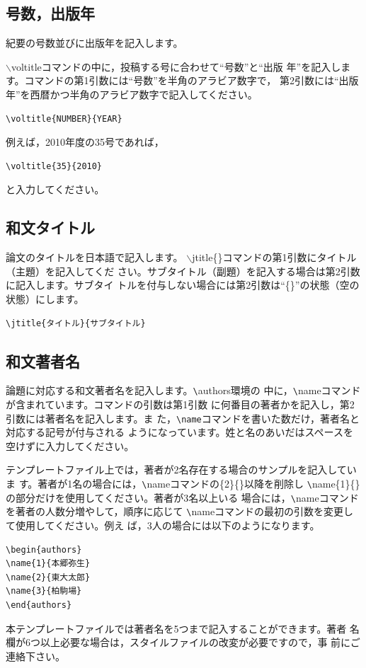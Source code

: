 \documentclass[b5paper,10pt,twocolumn,tombow]{jarticle}
\begin{document}
\subsection{号数，出版年}
紀要の号数並びに出版年を記入します。

$\backslash$voltitleコマンドの中に，投稿する号に合わせて``号数''と``出版
年''を記入します。コマンドの第1引数には``号数''を半角のアラビア数字で，
第2引数には``出版年''を西暦かつ半角のアラビア数字で記入してください。
\begin{verbatim}
\voltitle{NUMBER}{YEAR}
\end{verbatim}


例えば，2010年度の35号であれば，
\begin{verbatim}
\voltitle{35}{2010}
\end{verbatim}
と入力してください。

\subsection{和文タイトル}
論文のタイトルを日本語で記入します。
$\backslash$jtitle\{\}コマンドの第1引数にタイトル（主題）を記入してくだ
さい。サブタイトル（副題）を記入する場合は第2引数に記入します。サブタイ
トルを付与しない場合には第2引数は``\{\}''の状態（空の状態）にします。
\begin{verbatim}
\jtitle{タイトル}{サブタイトル}
\end{verbatim}

\subsection{和文著者名}
論題に対応する和文著者名を記入します。\verb|\|authors環境の
中に，\verb|\|nameコマンドが含まれています。コマンドの引数は第1引数
に何番目の著者かを記入し，第2引数には著者名を記入します。ま
た，\verb|\name|コマンドを書いた数だけ，著者名と対応する記号が付与される
ようになっています。姓と名のあいだはスペースを空けずに入力してください。

テンプレートファイル上では，著者が2名存在する場合のサンプルを記入していま
す。著者が1名の場合には，\verb|\|nameコマンドの\{2\}\{\}以降を削除し
\verb|\|name\{1\}\{\}の部分だけを使用してください。著者が3名以上いる
場合には，\verb|\|nameコマンドを著者の人数分増やして，順序に応じて
\verb|\|nameコマンドの最初の引数を変更して使用してください。例え
ば，3人の場合には以下のようになります。
\begin{verbatim}
\begin{authors}
\name{1}{本郷弥生}
\name{2}{東大太郎}
\name{3}{柏駒場}
\end{authors}
\end{verbatim}
本テンプレートファイルでは著者名を5つまで記入することができます。著者
名欄が6つ以上必要な場合は，スタイルファイルの改変が必要ですので，事
前にご連絡下さい。
\end{document}
